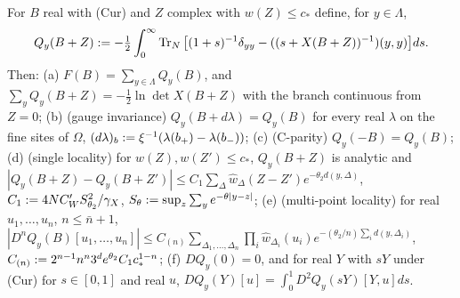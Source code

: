 
\begin{lemma}\label{lem:a06d:G1}
For $B$ real with (Cur) and $Z$ complex with $w(Z)\le c_*$ define, for $y\in\Lambda$,
\[
Q_y(B+Z):=-\tfrac12\int_0^\infty\operatorname{Tr}_N\big[(1+s)^{-1}\delta_{yy}-((s+X(B+Z))^{-1})(y,y)\big]ds.
\]
Then: \textup{(a)} $F(B)=\sum_{y\in\Lambda}Q_y(B)$, and $\sum_yQ_y(B+Z)=-\frac12\ln\det X(B+Z)$ with the branch continuous from $Z=0$; \textup{(b)} (gauge invariance) $Q_y(B+d\lambda)=Q_y(B)$ for every real $\lambda$ on the fine sites of $\Omega$, $(d\lambda)_b:=\xi^{-1}(\lambda(b_+)-\lambda(b_-))$; \textup{(c)} (C-parity) $Q_y(-B)=Q_y(B)$; \textup{(d)} (single locality) for $w(Z),w(Z')\le c_*$, $Q_y(B+Z)$ is analytic and $|Q_y(B+Z)-Q_y(B+Z')|\le C_1\sum_\Delta\hat w_\Delta(Z-Z')e^{-\theta_2d(y,\Delta)}$, $C_1:=4NC'_WS^2_{\theta_2}/\gamma_X$, $S_\theta:=\sup_z\sum_ye^{-\theta|y-z|}$; \textup{(e)} (multi-point locality) for real $u_1,\dots,u_n$, $n\le\bar n+1$, $|D^nQ_y(B)[u_1,\dots,u_n]|\le C_{(n)}\sum_{\Delta_1,\dots,\Delta_n}\prod_i\hat w_{\Delta_i}(u_i)e^{-(\theta_2/n)\sum_id(y,\Delta_i)}$, $C_{(n)}:=2^{n-1}n^n3^de^{\theta_2}C_1c_*^{1-n}$; \textup{(f)} $DQ_y(0)=0$, and for real $Y$ with $sY$ under (Cur) for $s\in[0,1]$ and real $u$, $DQ_y(Y)[u]=\int_0^1D^2Q_y(sY)[Y,u]ds$.
\end{lemma}

